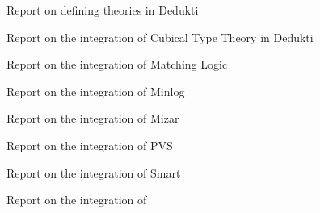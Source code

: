 \begin{workpackage}
\begin{tasklist}
\end{tasklist}

\begin{wpdelivs}
  \begin{wpdeliv}[due=18,id=wp2midterm,dissem=PU,nature=R,lead=Inn]{Report on defining theories in Dedukti}\end{wpdeliv}

  \begin{wpdeliv}[due=48,id=wp2cubical,dissem=PU,nature=R,lead=Inr,task=hott]{Report on the integration of Cubical Type Theory in Dedukti}\end{wpdeliv}

  \begin{wpdeliv}[due=42,id=wp2matching,dissem=PU,nature=R,lead=Ias,task=matching]{Report on the integration of Matching Logic}\end{wpdeliv}

  \begin{wpdeliv}[due=48,id=wp2minlog,dissem=PU,nature=R,lead=Lmu,task=minlog]{Report on the integration of Minlog}\end{wpdeliv}

  \begin{wpdeliv}[due=48,id=wp2mizar,dissem=PU,nature=R,lead=Bia,task=mizar]{Report on the integration of Mizar}\end{wpdeliv}

  \begin{wpdeliv}[due=48,id=wp2pvs,dissem=PU,nature=R,lead=Inr,task=pvs]{Report on the integration of PVS}\end{wpdeliv}
  
  \begin{wpdeliv}[due=48,id=wp2smart,dissem=PU,nature=R,lead=Pro,task=smart]{Report on the integration of Smart}\end{wpdeliv}
  
  \begin{wpdeliv}[due=48,id=wp2tlaplus,dissem=PU,nature=R,lead=Inr,task=tla]{Report on the integration of \tlaplus}\end{wpdeliv}
\end{wpdelivs}
\end{workpackage}



